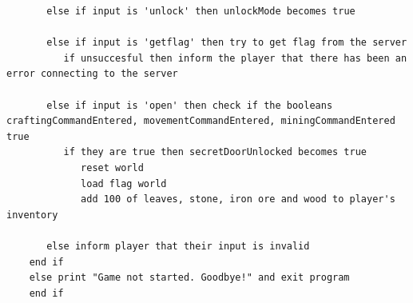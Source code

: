 \begin{lstlisting}
       else if input is 'unlock' then unlockMode becomes true
       
       else if input is 'getflag' then try to get flag from the server
          if unsuccesful then inform the player that there has been an error connecting to the server
    
       else if input is 'open' then check if the booleans craftingCommandEntered, movementCommandEntered, miningCommandEntered true
          if they are true then secretDoorUnlocked becomes true 
             reset world
             load flag world
             add 100 of leaves, stone, iron ore and wood to player's inventory
    
       else inform player that their input is invalid
    end if
    else print "Game not started. Goodbye!" and exit program
    end if
\end{lstlisting}
